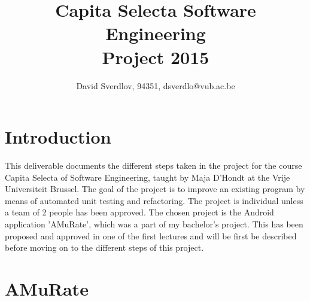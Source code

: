 \documentclass[12pt,portrait]{article}
\author{David Sverdlov, 94351, dsverdlo@vub.ac.be}
\title{Capita Selecta Software Engineering \\
 Project 2015} %
\begin{document}
\maketitle


\section{Introduction}

This deliverable documents the different steps taken in the project for the course Capita Selecta of Software Engineering, taught by Maja D'Hondt at the Vrije Universiteit Brussel. The goal of the project is to improve an existing program by means of automated unit testing and refactoring. The project is individual unless a team of 2 people has been approved. The chosen project is the Android application 'AMuRate', which was a part of my bachelor's project. This has been proposed and approved in one of the first lectures and will be first be described before moving on to the different steps of this project.

\section{AMuRate}
\end{document}
